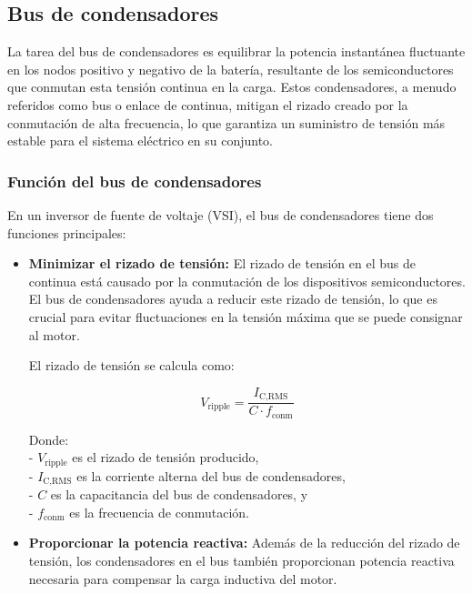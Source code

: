 \subsection{Bus de condensadores}

La tarea del bus de condensadores es equilibrar la potencia instantánea fluctuante en los nodos positivo y negativo de la batería, resultante de los semiconductores que conmutan esta tensión continua en la carga. Estos condensadores, a menudo referidos como bus o enlace de continua, mitigan el rizado creado por la conmutación de alta frecuencia, lo que garantiza un suministro de tensión más estable para el sistema eléctrico en su conjunto.

\subsubsection{Función del bus de condensadores}

En un inversor de fuente de voltaje (VSI), el bus de condensadores tiene dos funciones principales:

\begin{itemize}
	\item \textbf{Minimizar el rizado de tensión:} El rizado de tensión en el bus de continua está causado por la conmutación de los dispositivos semiconductores. El bus de condensadores ayuda a reducir este rizado de tensión, lo que es crucial para evitar fluctuaciones en la tensión máxima que se puede consignar al motor.
	
	El rizado de tensión se calcula como:
	
	\begin{equation}
	V_{\text{ripple}} = \frac{I_{\text{C,RMS}}}{C \cdot f_{\text{conm}}}
	\end{equation}
	
	Donde:\\
	- \( V_{\text{ripple}} \) es el rizado de tensión producido,\\
	- \( I_{\text{C,RMS}} \) es la corriente alterna del bus de condensadores,\\
	- \( C \) es la capacitancia del bus de condensadores, y\\
	- \( f_{\text{conm}} \) es la frecuencia de conmutación.\\
	
	\item \textbf{Proporcionar la potencia reactiva:} Además de la reducción del rizado de tensión, los condensadores en el bus también proporcionan potencia reactiva necesaria para compensar la carga inductiva del motor.
	
\end{itemize}

